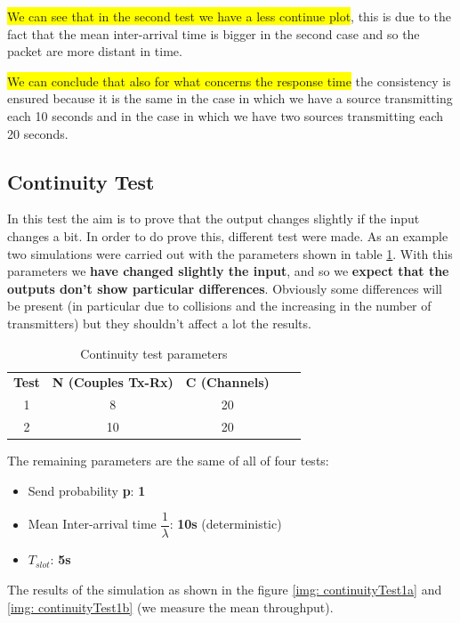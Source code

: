 \noindent \colorbox{yellow}{We can see that in the second test we have a less continue plot}, this is due to the fact that the mean inter-arrival time is bigger in the second case and so the packet are more distant in time.

\noindent \colorbox{yellow}{We can conclude that also for what concerns the response time} the consistency is ensured because it is the same in the case in which we have a source transmitting each 10 seconds and in the case in which we have two sources transmitting each 20 seconds. 

\subsection{Continuity Test}
In this test the aim is to prove that the output changes slightly if the input changes a bit. In order to do prove this, different test were made. As an example  two simulations were carried out with the parameters shown in table \ref{tab: continuity test}. With this parameters we \textbf{have changed slightly the input}, and so we \textbf{expect that the outputs don't show particular differences}. Obviously some differences will be present (in particular due to collisions and the increasing in the number of transmitters) but they shouldn't affect a lot the results.

\begin{table}[htpb]
	\centering
		\begin{tabular}{|c|c|c|ll}
			\cline{1-3}
			{\textbf{Test}} & { \textbf{N (Couples Tx-Rx)}} & { \textbf{C (Channels)}} &  &  \\ \cline{1-3}
			1 & 8  & 20 &  &  \\ \cline{1-3}
			2 & 10 & 20 &  &  \\ \cline{1-3}
		\end{tabular}
	\caption{Continuity test parameters}
	\label{tab: continuity test}
\end{table}

\noindent The remaining parameters are the same of all of four tests:
\begin{itemize}
	\item Send probability \textbf{p}: \textbf{1}
	\item Mean Inter-arrival time $\dfrac{1}{\lambda}$: \textbf{10s} (deterministic)
	\item $T_{slot}$: \textbf{5s}
\end{itemize}

\noindent The results of the simulation as shown in the figure \ref{img: continuityTest1a} and \ref{img: continuityTest1b} (we measure the mean throughput).

